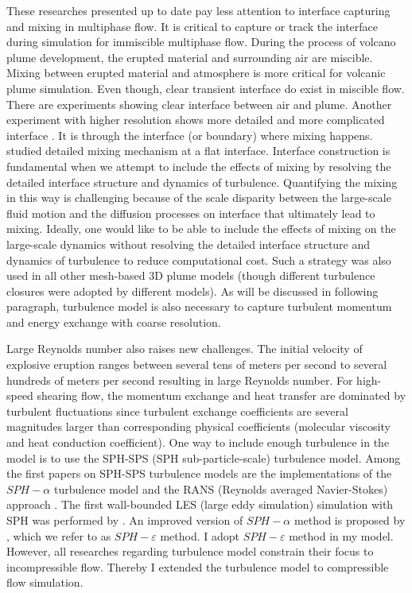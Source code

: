 These researches presented up to date pay less attention to interface capturing and mixing in multiphase flow. It is critical to capture or track the interface during simulation for immiscible multiphase flow. During the process of volcano plume development, the erupted material and surrounding air are miscible. Mixing between erupted material and atmosphere is more critical for volcanic plume simulation. Even though, clear transient interface do exist in miscible flow. There are experiments \citep {papantoniou1989large} showing clear interface between air and plume. Another experiment with higher resolution shows more detailed and more complicated interface \cite{crimaldi2001high}. 
It is through the interface (or boundary) where mixing happens. \citet{jacobson2008mixing} studied detailed mixing mechanism at a flat interface. Interface construction is fundamental when we attempt to include the effects of mixing by resolving the detailed interface structure and dynamics of turbulence. Quantifying the mixing in this way is challenging because of the scale disparity between the large-scale fluid motion and the diffusion processes on interface that ultimately lead to mixing. Ideally, one would like to be able to include the effects of mixing on the large-scale dynamics without resolving the detailed interface structure and dynamics of turbulence to reduce computational cost. Such a strategy was also used in all other mesh-based 3D plume models \citep{oberhuber1998volcanic, neri2003multiparticle, suzuki2005numerical, cerminara2016ashee} (though different turbulence closures were adopted by different models). As will be discussed in following paragraph, turbulence model is also necessary to capture turbulent momentum and energy exchange with coarse resolution.

Large Reynolds number also raises new challenges.
The initial velocity of explosive eruption ranges between several tens of meters per second to several hundreds of meters per second resulting in large Reynolds number. For high-speed shearing flow, the momentum exchange and heat transfer are dominated by turbulent fluctuations since turbulent exchange coefficients are several magnitudes larger than corresponding physical coefficients (molecular viscosity and heat conduction coefficient). 
One way to include enough turbulence in the model is to use the SPH-SPS (SPH sub-particle-scale) turbulence model.
Among the first papers on SPH-SPS turbulence models are the implementations of the $SPH-\alpha$ turbulence model \citep{holm1999fluctuation, monaghan2002sph} and the RANS (Reynolds averaged Navier-Stokes) approach \citep{violeau2007numerical}. The first wall-bounded LES (large eddy simulation) simulation with SPH was performed by \citet{issa2005numerical}. An improved version of $SPH-\alpha$ method  \citep{monaghan2002sph} is proposed by \citet{monaghan2011turbulence}, which we refer to as $SPH-\varepsilon$ method. I adopt $SPH-\varepsilon$ method in my model. However, all researches regarding turbulence model constrain their focus to incompressible flow. Thereby I extended the turbulence model to compressible flow simulation.

